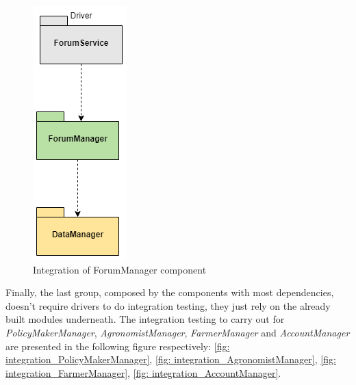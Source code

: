 \documentclass[table, 12pt]{article}
\begin{document}
\begin{figure}[H]
    \centering
    \includegraphics[scale=0.5]{assets/Test/forumTest.png}%
    \caption{Integration of ForumManager component}%
    \label{fig: integration_ForumManager_LocationModule}%
\end{figure}

Finally, the last group, composed by the components with most dependencies, doesn't require drivers to do integration testing, they just rely on the already built modules underneath. The integration testing to carry out for \emph{PolicyMakerManager}, \emph{AgronomistManager}, \emph{FarmerManager} and \emph{AccountManager} are presented in the following figure respectively: \ref{fig: integration_PolicyMakerManager}, \ref{fig: integration_AgronomistManager}, \ref{fig: integration_FarmerManager}, \ref{fig: integration_AccountManager}.
\end{document}
